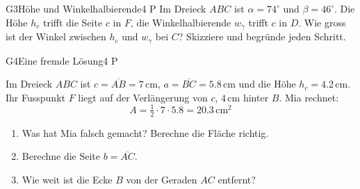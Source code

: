 \documentclass[11pt]{article}
\begin{document}
\begin{lpaufgabe}{G3}{Höhe und Winkelhalbierende}{4 P}
Im Dreieck $ABC$ ist $\alpha = 74^\circ$ und $\beta = 46^\circ$. Die Höhe $h_c$ trifft die Seite $c$ in $F$, die Winkelhalbierende
$w_\gamma$ trifft $c$ in $D$. Wie gross ist der Winkel zwischen $h_c$ und $w_\gamma$ bei $C$? Skizziere und begründe jeden Schritt.
\end{lpaufgabe}

\begin{lpaufgabe}{G4}{Eine fremde Lösung}{4 P}
\begin{minipage}[t]{0.50\linewidth}\vspace{0pt}
Im Dreieck $ABC$ ist $c = \overline{AB} = 7\,\text{cm}$, $a = \overline{BC} = 5.8\,\text{cm}$ und die Höhe $h_c = 4.2\,\text{cm}$.
Ihr Fusspunkt $F$ liegt auf der Verlängerung von $c$, $4\,\text{cm}$ hinter $B$. Mia rechnet:
\[ A = \tfrac{1}{2} \cdot 7 \cdot 5.8 = 20.3\,\text{cm}^2 \]
\begin{enumerate}[label=(\alph*),leftmargin=*,itemsep=2pt]
\item Was hat Mia falsch gemacht? Berechne die Fläche richtig.
\item Berechne die Seite $b = \overline{AC}$.
\item Wie weit ist die Ecke $B$ von der Geraden $AC$ entfernt?
\end{enumerate}
\end{minipage}\hfill
\begin{minipage}[t]{0.46\linewidth}\vspace{0pt}\centering
{}
\end{minipage}
\end{lpaufgabe}
\end{document}

